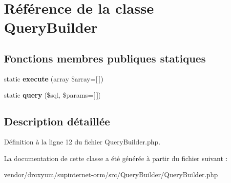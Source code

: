 \hypertarget{class_o_r_m_1_1_query_builder_1_1_query_builder}{}\section{Référence de la classe Query\+Builder}
\label{class_o_r_m_1_1_query_builder_1_1_query_builder}
\subsection*{Fonctions membres publiques statiques}
\begin{DoxyCompactItemize}
\item 
static {\bfseries execute} (array \$array=\mbox{[}$\,$\mbox{]})\hypertarget{class_o_r_m_1_1_query_builder_1_1_query_builder_a8308ebd9f6d3831bd557e3bd1bcca422}{}\label{class_o_r_m_1_1_query_builder_1_1_query_builder_a8308ebd9f6d3831bd557e3bd1bcca422}

\item 
static {\bfseries query} (\$sql, \$params=\mbox{[}$\,$\mbox{]})\hypertarget{class_o_r_m_1_1_query_builder_1_1_query_builder_ad3a4881669facc403647015a56c1c2c2}{}\label{class_o_r_m_1_1_query_builder_1_1_query_builder_ad3a4881669facc403647015a56c1c2c2}

\end{DoxyCompactItemize}


\subsection{Description détaillée}


Définition à la ligne 12 du fichier Query\+Builder.\+php.



La documentation de cette classe a été générée à partir du fichier suivant \+:\begin{DoxyCompactItemize}
\item 
vendor/droxyum/supinternet-\/orm/src/\+Query\+Builder/Query\+Builder.\+php\end{DoxyCompactItemize}
